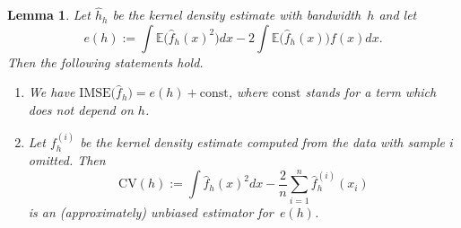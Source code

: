 \documentclass[
  a4paper,
]{article}
\newtheorem{lemma}{Lemma}[section]
\theoremstyle{definition}
\theoremstyle{definition}
\theoremstyle{definition}
\theoremstyle{definition}
\theoremstyle{remark}
\begin{document}
\begin{lemma}

Let \(\hat h_h\) be the kernel density estimate with bandwidth~\(h\)
and let
\begin{equation*}
  e(h)
  := \int \mathbb{E}\bigl( \hat f_h(x)^2 \bigr) dx - 2 \int \mathbb{E}\bigl( \hat f_h(x) \bigr) f(x) dx.
\end{equation*}
Then the following statements hold.

\begin{enumerate}
\def\labelenumi{(\alph{enumi})}
\item
  We have
  \(\mathrm{IMSE}\bigl( \hat f_h \bigr) = e(h) + \mathrm{const}\),
  where \(\mathrm{const}\) stands for a term which does not depend on \(h\).
\item
  Let \(f_h^{(i)}\) be the kernel density estimate computed from the data
  with sample \(i\) omitted.
  Then
  \begin{equation*}
    \mathrm{CV}(h) := \int \hat f_h(x)^2 dx - \frac{2}{n}\sum_{i=1}^n \hat f_h^{(i)}(x_i)
  \end{equation*}
  is an (approximately) unbiased estimator for~\(e(h)\).
\end{enumerate}

\end{lemma}
\end{document}
